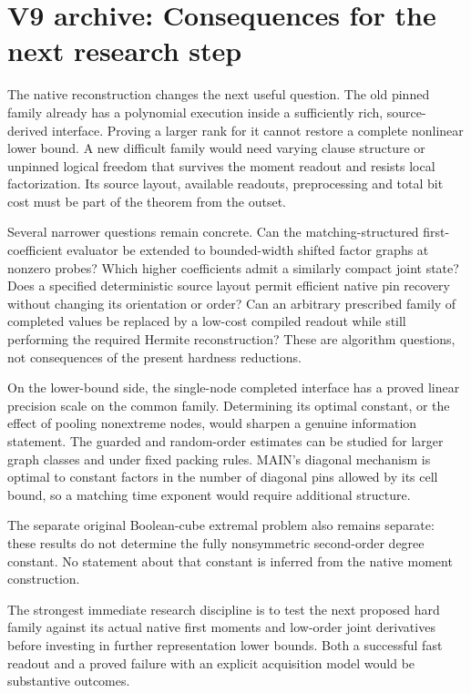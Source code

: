 \documentclass[
  11pt,
]{article}
\begin{document}
\section{V9 archive: Consequences for the next research step}\label{v9-consequences-for-the-next-research-step}

The native reconstruction changes the next useful question. The old
pinned family already has a polynomial execution inside a sufficiently
rich, source-derived interface. Proving a larger rank for it cannot
restore a complete nonlinear lower bound. A new difficult family would
need varying clause structure or unpinned logical freedom that survives
the moment readout and resists local factorization. Its source layout,
available readouts, preprocessing and total bit cost must be part of the
theorem from the outset.

Several narrower questions remain concrete. Can the matching-structured
first-coefficient evaluator be extended to bounded-width shifted factor
graphs at nonzero probes? Which higher coefficients admit a similarly
compact joint state? Does a specified deterministic source layout permit
efficient native pin recovery without changing its orientation or order?
Can an arbitrary prescribed family of completed values be replaced by a
low-cost compiled readout while still performing the required Hermite
reconstruction? These are algorithm questions, not consequences of the
present hardness reductions.

On the lower-bound side, the single-node completed interface has a
proved linear precision scale on the common family. Determining its
optimal constant, or the effect of pooling nonextreme nodes, would
sharpen a genuine information statement. The guarded and random-order
estimates can be studied for larger graph classes and under fixed
packing rules. MAIN's diagonal mechanism is optimal to constant factors
in the number of diagonal pins allowed by its cell bound, so a matching
time exponent would require additional structure.

The separate original Boolean-cube extremal problem also remains
separate: these results do not determine the fully nonsymmetric
second-order degree constant. No statement about that constant is
inferred from the native moment construction.

The strongest immediate research discipline is to test the next proposed
hard family against its actual native first moments and low-order joint
derivatives before investing in further representation lower bounds.
Both a successful fast readout and a proved failure with an explicit
acquisition model would be substantive outcomes.
\end{document}
